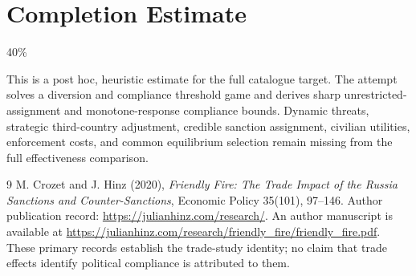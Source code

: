 \documentclass[11pt,a4paper]{article}
\begin{document}
\section{Completion Estimate}
40\%

This is a post hoc, heuristic estimate for the full catalogue target.
The attempt solves a diversion and compliance threshold game and derives sharp unrestricted-assignment and monotone-response compliance bounds. Dynamic threats, strategic third-country adjustment, credible sanction assignment, civilian utilities, enforcement costs, and common equilibrium selection remain missing from the full effectiveness comparison.

\begin{thebibliography}{9}
 M. Crozet and J. Hinz (2020), \emph{Friendly Fire: The Trade Impact of the Russia Sanctions and Counter-Sanctions}, Economic Policy 35(101), 97--146. Author publication record: \url{https://julianhinz.com/research/}. An author manuscript is available at \url{https://julianhinz.com/research/friendly_fire/friendly_fire.pdf}. These primary records establish the trade-study identity; no claim that trade effects identify political compliance is attributed to them.
\end{thebibliography}
\end{document}
